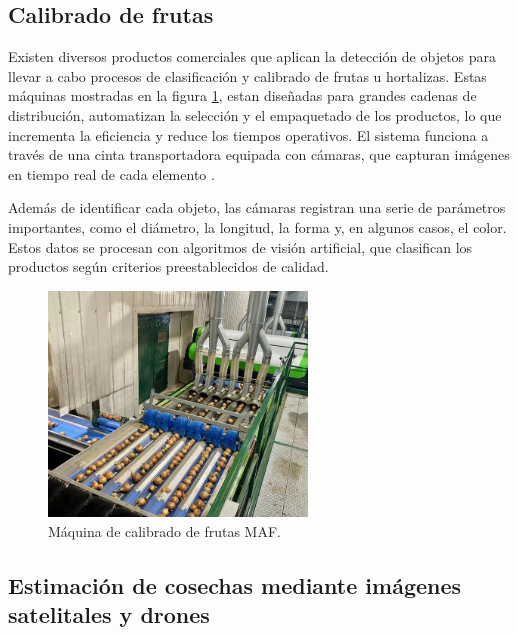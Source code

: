 \newpage
\subsection{Calibrado de frutas}

Existen diversos productos comerciales que aplican la detección de objetos para llevar a cabo procesos de clasificación y calibrado de frutas u hortalizas. Estas máquinas mostradas en la figura \ref{fig:calibrado_de_frutas}, estan diseñadas para grandes cadenas de distribución, automatizan la selección y el empaquetado de los productos, lo que incrementa la eficiencia y reduce los tiempos operativos. El sistema funciona a través de una cinta transportadora equipada con cámaras, que capturan imágenes en tiempo real de cada elemento \citep{WEBSITE:Unitec2024}.

Además de identificar cada objeto, las cámaras registran una serie de parámetros importantes, como el diámetro, la longitud, la forma y, en algunos casos, el color. Estos datos se procesan con algoritmos de visión artificial, que clasifican los productos según criterios preestablecidos de calidad.

\vspace{1cm}
\begin{figure}[htbp]
	\centering
	\includegraphics[width=.6\textwidth, height=6cm]{./Figures/calibrado_de_frutas.jpg}
	\caption{Máquina de calibrado de frutas MAF\protect\footnotemark.}
	\label{fig:calibrado_de_frutas}
\end{figure}
\vspace{1cm}


\subsection{Estimación de cosechas mediante imágenes satelitales y drones}

